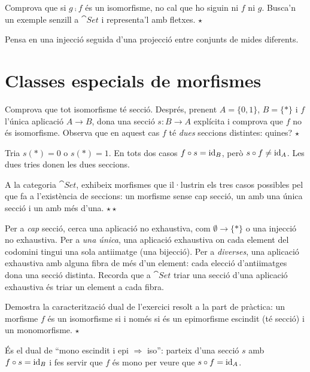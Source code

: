 \begin{exercici}
Comprova que si $g\comp f$ és un isomorfisme, no cal que ho siguin ni $f$ ni $g$. Busca'n un exemple senzill a $\cat{Set}$ i representa'l amb fletxes. \hfill{\normalfont$\star$}
\begin{indicacio}
Pensa en una injecció seguida d'una projecció entre conjunts de mides diferents.
\end{indicacio}
\end{exercici}

\section{Classes especials de morfismes}

\begin{exercici}
Comprova que tot isomorfisme té secció. Després, prenent $A=\{0,1\}$, $B=\{\ast\}$ i $f$ l'única aplicació $A\to B$, dona una secció $s\colon B\to A$ explícita i comprova que $f$ no és isomorfisme. Observa que en aquest cas $f$ té \emph{dues} seccions distintes: quines? \hfill{\normalfont$\star$}
\begin{indicacio}
Tria $s(\ast)=0$ o $s(\ast)=1$. En tots dos casos $f\circ s=\operatorname{id}_B$, però $s\circ f\neq\operatorname{id}_A$. Les dues tries donen les dues seccions.
\end{indicacio}
\end{exercici}

\begin{exercici}
A la categoria $\cat{Set}$, exhibeix morfismes que il·lustrin els tres casos possibles pel que fa a l'existència de seccions: un morfisme sense cap secció, un amb una única secció i un amb més d'una. \hfill{\normalfont$\star\star$}
\begin{indicacio}
Per a \emph{cap} secció, cerca una aplicació no exhaustiva, com $\emptyset\to\{\ast\}$ o una injecció no exhaustiva. Per a \emph{una única}, una aplicació exhaustiva on cada element del codomini tingui una sola antiimatge (una bijecció). Per a \emph{diverses}, una aplicació exhaustiva amb alguna fibra de més d'un element: cada elecció d'antiimatges dona una secció distinta. Recorda que a $\cat{Set}$ triar una secció d'una aplicació exhaustiva és triar un element a cada fibra.
\end{indicacio}
\end{exercici}

\begin{exercici}
Demostra la caracterització dual de l'exercici resolt a la part de pràctica: un morfisme $f$ és un isomorfisme si i només si és un epimorfisme escindit (té secció) i un monomorfisme. \hfill{\normalfont$\star$}
\begin{indicacio}
És el dual de \enquote{mono escindit i epi $\Rightarrow$ iso}: parteix d'una secció $s$ amb $f\circ s=\operatorname{id}_B$ i fes servir que $f$ és mono per veure que $s\circ f=\operatorname{id}_A$.
\end{indicacio}
\end{exercici}

